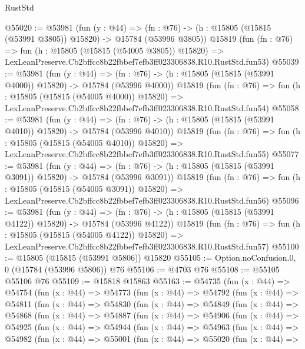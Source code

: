 \begin{lexlean}{RustStd}
\begin{coremodule}
@55020 := @53981
    (fun (y : @44) =>
    (fn : @76) -> (h : @15805 (@15815 (@53991 @3805)) @15820) -> @15784 (@53996 @3805))
    @15819
    (fun (fn : @76) =>
    fun (h : @15805 (@15815 (@54005 @3805)) @15820) =>
    LexLeanPreserve.Cb2bffcc8b22fbbef7efb3ff023306838.R10.RustStd.fun53)
@55039 := @53981
    (fun (y : @44) =>
    (fn : @76) -> (h : @15805 (@15815 (@53991 @4000)) @15820) -> @15784 (@53996 @4000))
    @15819
    (fun (fn : @76) =>
    fun (h : @15805 (@15815 (@54005 @4000)) @15820) =>
    LexLeanPreserve.Cb2bffcc8b22fbbef7efb3ff023306838.R10.RustStd.fun54)
@55058 := @53981
    (fun (y : @44) =>
    (fn : @76) -> (h : @15805 (@15815 (@53991 @4010)) @15820) -> @15784 (@53996 @4010))
    @15819
    (fun (fn : @76) =>
    fun (h : @15805 (@15815 (@54005 @4010)) @15820) =>
    LexLeanPreserve.Cb2bffcc8b22fbbef7efb3ff023306838.R10.RustStd.fun55)
@55077 := @53981
    (fun (y : @44) =>
    (fn : @76) -> (h : @15805 (@15815 (@53991 @3091)) @15820) -> @15784 (@53996 @3091))
    @15819
    (fun (fn : @76) =>
    fun (h : @15805 (@15815 (@54005 @3091)) @15820) =>
    LexLeanPreserve.Cb2bffcc8b22fbbef7efb3ff023306838.R10.RustStd.fun56)
@55096 := @53981
    (fun (y : @44) =>
    (fn : @76) -> (h : @15805 (@15815 (@53991 @4122)) @15820) -> @15784 (@53996 @4122))
    @15819
    (fun (fn : @76) =>
    fun (h : @15805 (@15815 (@54005 @4122)) @15820) =>
    LexLeanPreserve.Cb2bffcc8b22fbbef7efb3ff023306838.R10.RustStd.fun57)
@55100 := @15805 (@15815 (@53991 @5806)) @15820
@55105 := Option.noConfusion.{0, 0} (@15784 (@53996 @5806)) @76
@55106 := @4703 @76
@55108 := @55105 @55106 @76
@55109 := @15818 @15863
@55163 := @54735
    (fun (x : @44) =>
    @54754
      (fun (x : @44) =>
      @54773
        (fun (x : @44) =>
        @54792
          (fun (x : @44) =>
          @54811
            (fun (x : @44) =>
            @54830
              (fun (x : @44) =>
              @54849
                (fun (x : @44) =>
                @54868
                  (fun (x : @44) =>
                  @54887
                    (fun (x : @44) =>
                    @54906
                      (fun (x : @44) =>
                      @54925
                        (fun (x : @44) =>
                        @54944
                          (fun (x : @44) =>
                          @54963
                            (fun (x : @44) =>
                            @54982
                              (fun (x : @44) =>
                              @55001
                                (fun (x : @44) =>
                                @55020
                                  (fun (x : @44) =>

\end{coremodule}
\end{lexlean}

